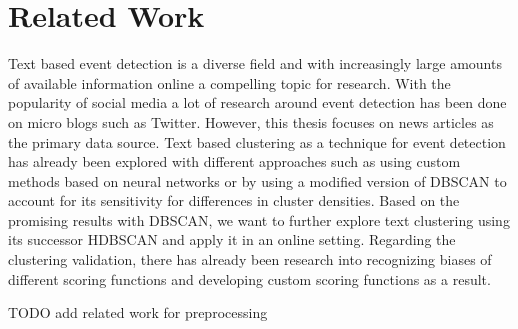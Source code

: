 \section{Related Work}
\label{sec:2_related_work}

Text based event detection is a diverse field and with increasingly large amounts
of available information online a compelling topic for research.
With the popularity of social media a lot of research around event detection
has been done on micro blogs\cite{microblog_clustering} such as Twitter\cite{twitter_survey, social_media_survey}.
However, this thesis focuses on news articles as the primary data source.
Text based clustering as a technique for event detection
has already been explored with different approaches such as
using custom methods based on neural networks\cite{text_clustering_topic_detection}
or by using a modified version of DBSCAN
to account for its sensitivity for differences in cluster densities\cite{dbscan_martingale}.
Based on the promising results with DBSCAN, we want to further explore text clustering
using its successor HDBSCAN\cite{McInnes2017} and apply it in an online setting.
Regarding the clustering validation, there has already been research into recognizing biases
of different scoring functions\cite{Wu:2009:ARM:1557019.1557115}
and developing custom scoring functions as a result\cite{gates2017comparing}.

TODO add related work for preprocessing